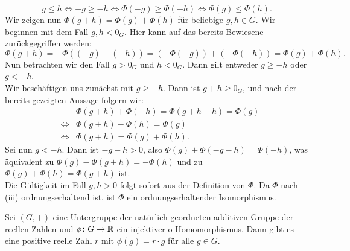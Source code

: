 {\[g \le h \Leftrightarrow -g \geq -h \Leftrightarrow \Phi\left(-g\right) \geq \Phi\left(-h\right) \Leftrightarrow \Phi\left(g\right) \le \Phi\left(h\right).\]
Wir zeigen nun $\Phi(g+h) = \Phi\left(g\right) +\Phi\left(h\right)$ für beliebige $g,h \in G$. Wir beginnen mit dem Fall $g, h < 0_G$. Hier kann auf das bereits Bewiesene zurückgegriffen werden: 
\[\Phi\left(g+h\right) = −\Phi\left((−g)+(−h)\right) = (−\Phi(−g))+(−\Phi(−h)) = \Phi(g)+\Phi(h).\]
Nun betrachten wir den Fall $g>0_G$ und $h < 0_G$. Dann gilt entweder $g\geq −h$ oder $g < -h$. \\
Wir beschäftigen uns zunächst mit $g \geq -h$. Dann ist $g+h \geq 0_G$, und nach der bereits gezeigten Aussage folgern wir:\\
\begin{eqnarray*}
&&\Phi(g+h)+ \Phi(−h) = \Phi(g + h -h) = \Phi(g) \\
&\Leftrightarrow& \Phi(g+h)−\Phi(h) = \Phi(g) \\
&\Leftrightarrow& \Phi(g+h) = \Phi(g)+ \Phi(h).
\end{eqnarray*}
Sei nun $g < −h$. Dann ist $−g−h > 0$, also $\Phi(g)+\Phi(−g−h) = \Phi(−h)$, was äquivalent zu $\Phi(g)−\Phi(g+h) = −\Phi(h)$ und zu $\Phi(g)+ \Phi(h) = \Phi(g+ h)$ ist.
\\ Die Gültigkeit im Fall $g,h > 0$ folgt sofort aus der Definition von $\Phi$. 
Da $\Phi$ nach (iii) ordnungserhaltend ist, ist $\Phi$ ein ordnungserhaltender Isomorphismus.}
%
\begin{satz}\label{homomorphismus nach R} %
Sei $\left(G, +\right)$ eine Untergruppe der natürlich geordneten additiven Gruppe der reellen Zahlen und $\phi\colon G \rightarrow \mathbb{R}$ ein injektiver o-Homomorphismus. Dann gibt es eine positive reelle Zahl $r$ mit $\phi(g) = r\cdot g$ für alle $g \in G$. 
\end{satz}
%
%
